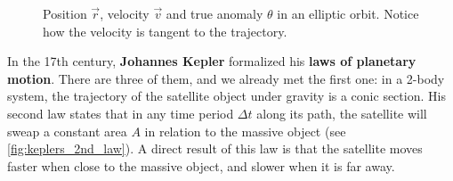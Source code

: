 \begin{figure}
  \begin{center}
  \end{center}
  \caption{Position $\vec{r}$, velocity $\vec{v}$ and true anomaly $\theta$ in an elliptic orbit. Notice how the velocity is tangent to the trajectory.}
  \label{fig:magnitudes_elliptical_orbit}
\end{figure}


In the 17th century, \textbf{Johannes Kepler} formalized his \textbf{laws of planetary motion}. There are three of them, and we already met the first one: in a 2-body system, the trajectory of the satellite object under gravity is a conic section. His second law states that in any time period $\Delta t$ along its path, the satellite will sweap a constant area $A$ in relation to the massive object (see \autoref{fig:keplers_2nd_law}). A direct result of this law is that the satellite moves faster when close to the massive object, and slower when it is far away.

